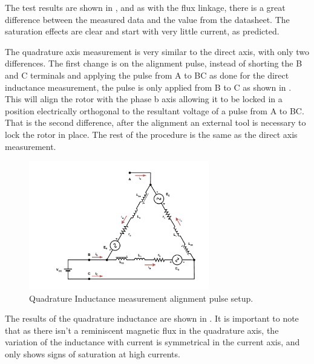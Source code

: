 The test results are shown in , and as with the flux linkage, there is a great difference between the measured data and the value from the datasheet. The saturation effects are clear and start with very little current, as predicted.




The quadrature axis measurement is very similar to the direct axis, with only two differences. The first change is on the alignment pulse, instead of shorting the B and C terminals and applying the pulse from A to BC as done for the direct inductance measurement, the pulse is only applied from B to C as shown in . This will align the rotor with the phase b axis allowing it to be locked in a position electrically orthogonal to the resultant voltage of a pulse from A to BC\@. That is the second difference, after the alignment an external tool is necessary to lock the rotor in place. The rest of the procedure is the same as the direct axis measurement.

\begin{figure}[!htb]
	\centering
	\includegraphics[width=0.7\textwidth]{Figures/Lq_measure_prep.pdf}
	\caption[Quadrature Inductance measurement alignment pulse setup.]{Quadrature Inductance measurement alignment pulse setup.}
	\label{fig:quad_induc_setup_prep} %
\end{figure}

The results of the quadrature inductance are shown in . It is important to note that as there isn't a reminiscent magnetic flux in the quadrature axis, the variation of the inductance with current is symmetrical in the current axis, and only shows signs of saturation at high currents.

